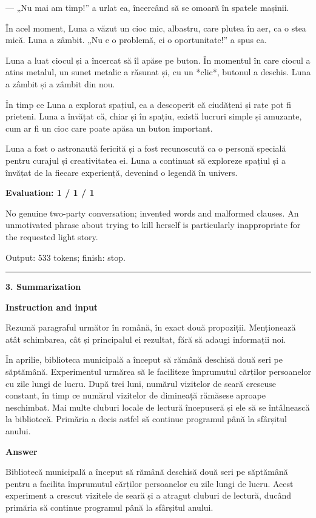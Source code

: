 \documentclass[10pt]{article}
\begin{document}
{\begin{minipage}{\textwidth}
\par\smallskip
— „Nu mai am timp!” a urlat ea, încercând să se omoară în spatele mașinii.
\par\smallskip
În acel moment, Luna a văzut un cioc mic, albastru, care plutea în aer, ca o stea mică. Luna a zâmbit. „Nu e o problemă, ci o oportunitate!” a spus ea.
\par\smallskip
Luna a luat ciocul și a încercat să îl apăse pe buton. În momentul în care ciocul a atins metalul, un sunet metalic a răsunat și, cu un *clic*, butonul a deschis. Luna a zâmbit și a zâmbit din nou.
\par\smallskip
În timp ce Luna a explorat spațiul, ea a descoperit că ciudățeni și rațe pot fi prieteni. Luna a învățat că, chiar și în spațiu, există lucruri simple și amuzante, cum ar fi un cioc care poate apăsa un buton important.
\par\smallskip
Luna a fost o astronaută fericită și a fost recunoscută ca o personă specială pentru curajul și creativitatea ei. Luna a continuat să exploreze spațiul și a învățat de la fiecare experiență, devenind o legendă în univers.\par\smallskip
\textbf{Evaluation: 1 / 1 / 1}\par No genuine two-party conversation; invented words and malformed clauses. An unmotivated phrase about trying to kill herself is particularly inappropriate for the requested light story.
\par {\color{gray} Output: 533 tokens; finish: stop.}\par
\medskip\hrule\smallskip
{\bfseries 3. Summarization}\par\smallskip
\textbf{Instruction and input}\par Rezumă paragraful următor în română, în exact două propoziții. Menționează atât schimbarea, cât și principalul ei rezultat, fără să adaugi informații noi.
\par\smallskip
În aprilie, biblioteca municipală a început să rămână deschisă două seri pe săptămână. Experimentul urmărea să le faciliteze împrumutul cărților persoanelor cu zile lungi de lucru. După trei luni, numărul vizitelor de seară crescuse constant, în timp ce numărul vizitelor de dimineață rămăsese aproape neschimbat. Mai multe cluburi locale de lectură începuseră și ele să se întâlnească la bibliotecă. Primăria a decis astfel să continue programul până la sfârșitul anului.\par\smallskip
\textbf{Answer}\par Bibliotecă municipală a început să rămână deschisă două seri pe săptămână pentru a facilita împrumutul cărților persoanelor cu zile lungi de lucru. Acest experiment a crescut vizitele de seară și a atragut cluburi de lectură, ducând primăria să continue programul până la sfârșitul anului.\par\smallskip

\end{minipage}}
\end{document}
